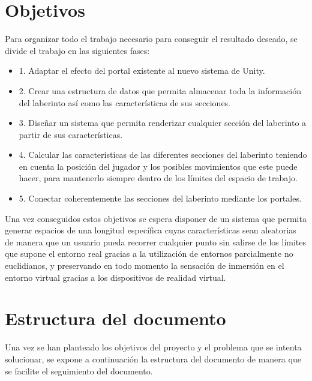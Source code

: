 \documentclass[../main.tex]{subfiles}
\begin{document}
\section{Objetivos} \label{Objectives}

Para organizar todo el trabajo necesario para conseguir el resultado deseado, se divide el trabajo en las siguientes fases:

\begin{itemize}
    \item 1. Adaptar el efecto del portal existente al nuevo sistema de Unity.
    \item 2. Crear una estructura de datos que permita almacenar toda la información del laberinto así como las características de sus secciones.
    \item 3. Diseñar un sistema que permita renderizar cualquier sección del laberinto a partir de sus características.
    \item 4. Calcular las características de las diferentes secciones del laberinto teniendo en cuenta la posición del jugador y los posibles movimientos que este puede hacer, para mantenerlo siempre dentro de los límites del espacio de trabajo.
    \item 5. Conectar coherentemente las secciones del laberinto mediante los portales.
\end{itemize}

Una vez conseguidos estos objetivos se espera disponer de un sistema que permita generar espacios de una longitud específica cuyas características sean aleatorias de manera que un usuario pueda recorrer cualquier punto sin salirse de los límites que supone el entorno real gracias a la utilización de entornos parcialmente no euclidianos, y preservando en todo momento la sensación de inmersión en el entorno virtual gracias a los dispositivos de realidad virtual.

\section{Estructura del documento}

Una vez se han planteado los objetivos del proyecto y el problema que se intenta solucionar, se expone a continuación la estructura del documento de manera que se facilite el seguimiento del documento.
\end{document}
